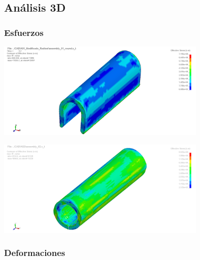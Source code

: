 \subsection{Análisis 3D}




\subsubsection{Esfuerzos}


\begin{center}
\includegraphics[width=0.75\textwidth]{src/ch4/von_mises_3D_01.png}
\label{fig:von_mises_3D_01}
\end{center}

\begin{center}
\includegraphics[width=0.75\textwidth]{src/ch4/von_mises_3D_02.png}
\label{fig:von_mises_3D_02}
\end{center}

\subsubsection{Deformaciones}

